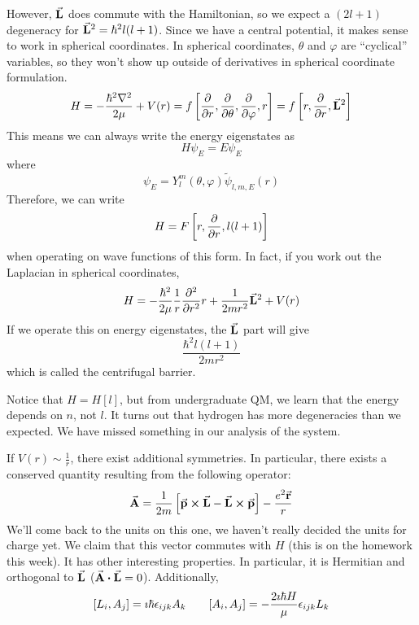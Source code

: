 \documentclass[a4paper,twoside,master.tex]{subfiles}
\begin{document}
However, $ \va{L} $ does commute with the Hamiltonian, so we expect a $ (2l+1) $ degeneracy for $ \va{L}^2 = \hbar^2 l(l+1) $. Since we have a central potential, it makes sense to work in spherical coordinates. In spherical coordinates, $ \theta $ and $\varphi$ are ``cyclical'' variables, so they won't show up outside of derivatives in spherical coordinate formulation.
\begin{equation}
    H = - \frac{\hbar^2 \laplacian}{2 \mu} + V(r) = f\left[ \pdv{r}, \pdv{\theta}, \pdv{\varphi}, r \right] = f\left[ r, \pdv{r}, \va{L}^2 \right]
\end{equation}
This means we can always write the energy eigenstates as
\begin{equation}
    H \psi_E = E \psi_E
\end{equation}
where
\begin{equation}
    \psi_E = Y_l^m(\theta, \varphi) \tilde{\psi}_{l,m,E}(r)
\end{equation}
Therefore, we can write
\begin{equation}
    H = F\left[ r, \pdv{r}, l(l+1) \right]
\end{equation}
when operating on wave functions of this form. In fact, if you work out the Laplacian in spherical coordinates,
\begin{equation}
    H = - \frac{\hbar^2}{2 \mu} \frac{1}{r} \pdv[2]{r} r + \frac{1}{2 m r^2} \va{L}^2 + V(r)
\end{equation}
If we operate this on energy eigenstates, the $ \va{L} $ part will give
\begin{equation}
    \frac{\hbar^2 l(l+1)}{2m r^2}
\end{equation}
which is called the centrifugal barrier.

Notice that $ H = H\left[ l \right] $, but from undergraduate QM, we learn that the energy depends on $ n $, not $ l $. It turns out that hydrogen has more degeneracies than we expected. We have missed something in our analysis of the system.

If $ V(r) \sim \frac{1}{r} $, there exist additional symmetries. In particular, there exists a conserved quantity resulting from the following operator:
\begin{equation}
    \va{A} = \frac{1}{2m} \left[ \va{p} \cross \va{L} - \va{L} \cross \va{p} \right] - \frac{e^2 \va{r}}{r}
\end{equation}
We'll come back to the units on this one, we haven't really decided the units for charge yet. We claim that this vector commutes with $ H $ (this is on the homework this week). It has other interesting properties. In particular, it is Hermitian and orthogonal to $ \va{L} $ ($ \va{A} \vdot \va{L} = 0 $). Additionally,
\begin{equation}
    \comm{L_i}{A_j} = \imath \hbar \epsilon_{ijk} A_k \qquad \comm{A_i}{A_j} = - \frac{2 \imath \hbar H}{\mu} \epsilon_{ijk} L_k
\end{equation}
\end{document}
